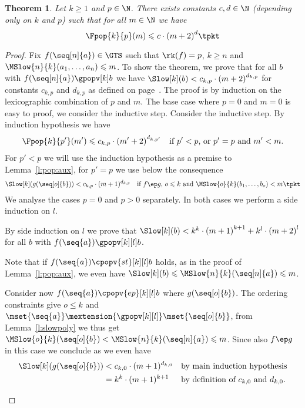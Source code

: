 \documentclass{LMCS}
\newtheorem{theorem}[thm]{Theorem}
\begin{document}
\begin{theorem}\label{t:pop}
  Let $k \geqslant 1$ and $p \in \N$. There exists constants $c,d \in \N$ 
  (depending only on $k$ and $p$) such that 
  for all $m \in \N$ we have 
  $$
  \Fpop{k}{p}(m) \leqslant c \cdot {(m+2)}^{d} \tpkt
  $$
\end{theorem}
\begin{proof}
  Fix $f(\seq[n]{a}) \in \GTS$ such that $\rk(f) = p$, $k \geqslant n$ and $\MSlow{n}{k}(a_1,\dots,a_n) \leqslant m$.
To show the theorem, we prove that for all $b$ with $f(\seq[n]{a}) \gpopv[k] b$ 
  we have $\Slow[k](b) < c_{k,p} \cdot {(m+2)}^{d_{k,p}}$ 
  for constants $c_{k,p}$ and $d_{k,p}$ as defined on page~\pageref{d:dkp:ckp}.
  The proof is by induction on the lexicographic combination of $p$ and $m$.
  The base case where $p = 0$ and $m = 0$ is easy to proof, we consider the inductive 
  step. 
  Consider the inductive step. By induction hypothesis 
  we have 
  \begin{align*}
      \Fpop{k}{p'}(m') \leqslant c_{k,p} \cdot {(m'+2)}^{d_{k,p'}} \text{\quad if $p' < p$, or $p' = p$ and $m' < m$.}
  \end{align*}
  For $p' < p$ we will use the induction hypothesis as a premise to Lemma~\ref{l:pop:aux}, 
  for $p' = p$ we use below the consequence
  \begin{align}
    \label{t:pop:ih}
    \Slow[k](g(\seq[o]{b})) < c_{k,p} \cdot (m+1)^{d_{k,p}} 
    \text{\quad if $f \ep g$, $o \leqslant k$ and $\MSlow{o}{k}(b_1,\dots,b_o) < m$} \tpkt
  \end{align}
  We analyse the cases $p = 0$ and $p > 0$ separately. 
  In both cases we perform a side induction on $l$. 
  \smallskip 
  \begin{description}[leftmargin=0.3cm]
  \item[\dcase{$p = 0$}]
    By side induction on $l$ we prove that $\Slow[k](b) < k^k \cdot {(m+1)}^{k+1} + k^l \cdot {(m + 2)}^l$
    for all $b$ with $f(\seq{a}) \gpopv[k][l] b$.
    
    Note that if $f(\seq{a}) \cpopv{st}[k][l] b$ holds, 
    as in the proof of Lemma~\ref{l:pop:aux},
    we even have $\Slow[k](b) \leqslant \MSlow{n}{k}(\seq[n]{a}) \leqslant m$. 

    Consider now $f(\seq{a}) \cpopv{ep}[k][l] b$ where $g(\seq[o]{b})$. 
    The ordering constraints give $o \leqslant k$ and
    $\mset{\seq{a}} \mextension{\gpopv[k][l]} \mset{\seq[o]{b}}$, 
    from Lemma~\ref{l:slowpoly} we thus get $\MSlow{o}{k}(\seq[o]{b}) < \MSlow{n}{k}(\seq[n]{a}) \leqslant m$. 
Since also $f \ep g$ in this case
    we conclude as we even have
    \begin{align*}
      \Slow[k](g(\seq[o]{b})) 
      & < c_{k,0} \cdot (m + 1)^{d_{k,0}} 
      && \text{by main induction hypothesis}\\
      & = k^k \cdot (m + 1)^{k+1} 
      && \text{by definition of $c_{k,0}$ and $d_{k,0}$.}
    \end{align*}


\end{description}
\end{proof}
\end{document}
